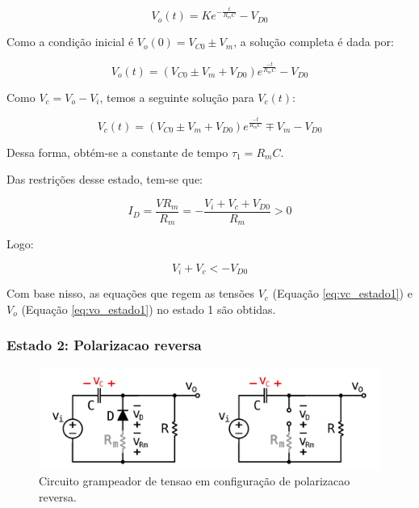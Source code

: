 \begin{equation}
    \tag*{Solucao completa}
    V_o(t) = K e^{-\frac{t}{R_m C}} - V_{D0}
\end{equation}

Como a condição inicial é $V_o(0) = V_{C0} \pm V_m$, a solução completa é dada por:

\begin{equation}
    \label{eq:vo_estado1}
    V_o(t) = (V_{C0} \pm V_m + V_{D0}) e^\frac{-t}{R_m C} - V_{D0}
\end{equation}

Como $V_c = V_o - V_i$, temos a seguinte solução para $V_c(t)$:

\begin{equation}
    \label{eq:vc_estado1}
    V_c(t) = (V_{C0} \pm V_m + V_{D0}) e^\frac{-t}{R_m C} \mp V_m - V_{D0}
\end{equation}

Dessa forma, obtém-se a constante de tempo $\tau_1 = R_m C$.

Das restrições desse estado, tem-se que:

\begin{equation}
    I_D = \frac{V R_m}{R_m} = - \frac{V_i + V_c + V_{D0}}{R_m} > 0
\end{equation}

Logo:

\begin{equation}
    V_i + V_c < - V_{D0}
\end{equation}

Com base nisso, as equações que regem as tensões $V_c$ (Equação \ref{eq:vc_estado1}) e $V_o$ (Equação \ref{eq:vo_estado1}) no estado 1 são obtidas.


\subsubsection{Estado 2: Polarizacao reversa}


\begin{figure}[h]
    \centering
    \includegraphics[width=1\columnwidth]{images/o_circuito_reverso.png}
    \caption{Circuito grampeador de tensao em configuração de polarizacao reversa.}
\end{figure}

